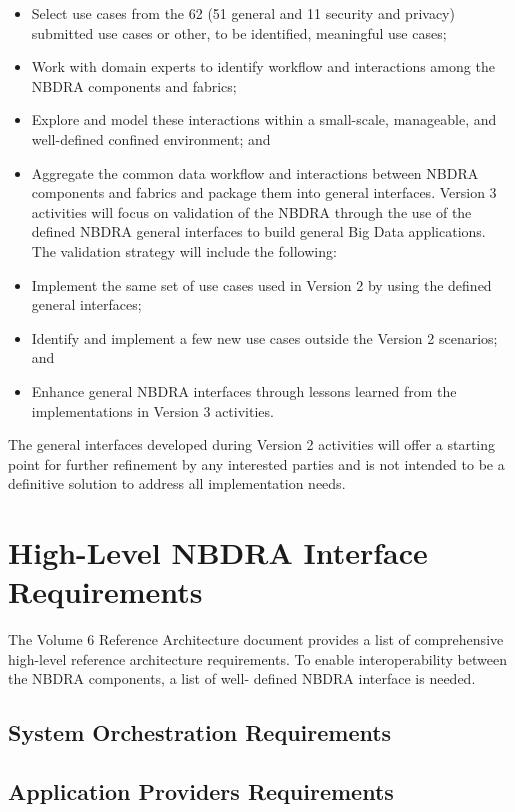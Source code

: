 \documentclass[11pt]{article}
\newcommand{\TODO}[1]{\todo{#1}}
\begin{document}
\begin{itemize}
\item	Select use cases from the 62 (51 general and 11 security and privacy) submitted use cases or 
other, to be identified, meaningful use cases;
\item	Work with domain experts to identify workflow and interactions among the NBDRA 
components and fabrics;
\item	Explore and model these interactions within a small-scale, manageable, and well-defined 
confined environment; and 
\item	Aggregate the common data workflow and interactions between NBDRA components and 
fabrics and package them into general interfaces.
Version 3 activities will focus on validation of the NBDRA through the use of the defined NBDRA 
general interfaces to build general Big Data applications. The validation strategy will include the 
following:
\item	Implement the same set of use cases used in Version 2 by using the defined general interfaces;
\item	Identify and implement a few new use cases outside the Version 2 scenarios; and
\item	Enhance general NBDRA interfaces through lessons learned from the implementations in 
Version 3 activities.
\end{itemize}


The general interfaces developed during Version 2 activities will offer a starting point for further 
refinement by any interested parties and is not intended to be a definitive solution to address all 
implementation needs. 

\section{High-Level NBDRA Interface Requirements}
The Volume 6 Reference Architecture document provides a list of comprehensive high-level reference 
architecture requirements. To enable interoperability between the NBDRA components, a list of well-
defined NBDRA interface is needed.  

\subsection{System Orchestration Requirements}

\TODO{TBD}
\subsection{Application Providers Requirements}
\end{document}
